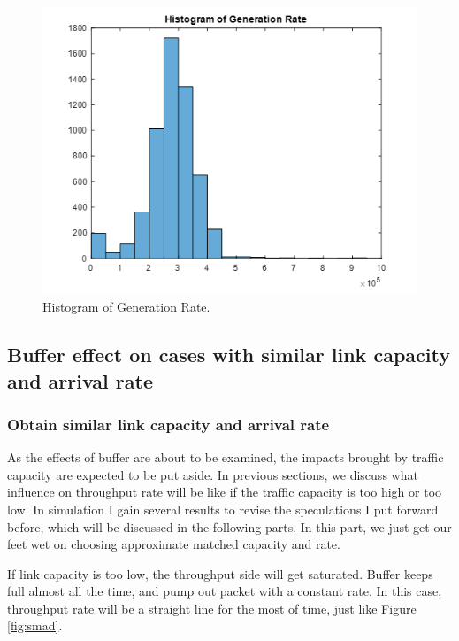 \documentclass[a4paper]{article}
\begin{document}
\begin{figure}
\centering
\includegraphics[width=1\textwidth]{hist.png}
\caption{\label{fig:hist}Histogram of Generation Rate.}
\end{figure}

\subsection{Buffer effect on cases with similar link capacity and arrival rate}
\subsubsection{Obtain similar link capacity and arrival rate}
As the effects of buffer are about to be examined, the impacts brought by traffic capacity are expected to be put aside. In previous sections, we discuss what influence on throughput rate will be like if the traffic capacity is too high or too low. In simulation I gain several results to revise the speculations I put forward before, which will be discussed in the following parts. In this part, we just get our feet wet on choosing approximate matched capacity and rate.
	
If link capacity is too low, the throughput side will get saturated. Buffer keeps full almost all the time, and pump out packet with a constant rate. In this case, throughput rate will be a straight line for the most of time, just like Figure \ref{fig:smad}.
\end{document}
